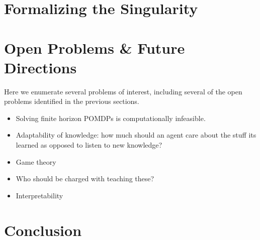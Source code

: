 \documentclass[11pt]{article}
\begin{document}


\section{Formalizing the Singularity}





\section{Open Problems \& Future Directions}

Here we enumerate several problems of interest, including several of the open problems identified in the previous sections.

\begin{itemize}
\item Solving finite horizon POMDPs is computationally infeasible.
\item Adaptability of knowledge: how much should an agent care about the stuff its learned as opposed to listen to new knowledge?
\item Game theory
\item Who should be charged with teaching these?
\item Interpretability
\end{itemize}



\section{Conclusion}




\end{document}
